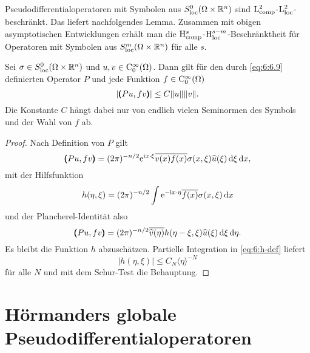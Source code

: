 Pseudodifferentialoperatoren mit Symbolen aus $S^0_{\rm loc}(\Omega\times\mathbb R^n)$ sind $\mathrm L^2_{\rm comp}$-$\mathrm L^2_{\rm loc}$-beschränkt. Das liefert nachfolgendes Lemma. Zusammen mit obigen asymptotischen Entwicklungen erhält man die $\mathrm H^s_{\rm comp}$-$\mathrm H^{s-m}_{\rm loc}$-Beschränktheit für Operatoren mit Symbolen aus $S^m_{\rm loc}(\Omega\times\mathbb R^n)$ für alle $s$.
\begin{lem}
Sei $\sigma\in S^0_{\rm loc}(\Omega\times\mathbb R^n)$ und $u,v\in\mathrm C_0^\infty(\Omega)$. Dann gilt für den durch \eqref{eq:6:6.9} definierten Operator $P$
und jede Funktion $f\in\mathrm C_0^\infty(\Omega)$
\begin{equation}
   | \pmb(Pu,f v\pmb) | \le C \|u\|\|v\|.
\end{equation}
Die Konstante $C$ hängt dabei nur von endlich vielen Seminormen des Symbols und der Wahl von $f$ ab.
\end{lem}
\begin{proof}
Nach Definition von $P$ gilt
\begin{equation}
   \pmb(Pu,fv\pmb) = (2\pi)^{-n/2} \relax \mathrm e^{\mathrm i x\cdot \xi}\overline{ v(x) f(x)} \sigma(x,\xi) \widehat u(\xi)\,\mathrm d\xi\,\mathrm d x,
\end{equation}
mit der Hilfsfunktion
\begin{equation}\label{eq:6:h-def}
  h(\eta,\xi) =  (2\pi)^{-n/2} \int \mathrm e^{-\mathrm i x\cdot\eta} \overline{f(x)} \sigma(x,\xi) \,\mathrm d x
\end{equation}
und der Plancherel-Identität also
\begin{equation}
   \pmb(Pu,fv\pmb) = (2\pi)^{-n/2} \relax \overline{ \widehat v(\eta) }h(\eta-\xi,\xi) \widehat u(\xi)\,\mathrm d\xi\,\mathrm d\eta.
\end{equation}
Es bleibt die Funktion $h$ abzuschätzen. Partielle Integration in \eqref{eq:6:h-def} liefert
\begin{equation}
   |h(\eta,\xi)|  \le C_N \langle\eta\rangle^{-N}
\end{equation}
für alle $N$ und mit dem Schur-Test die Behauptung.
\end{proof}

\section{Hörmanders globale Pseudodifferentialoperatoren}

